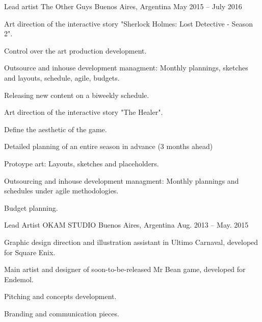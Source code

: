 

\begin{cventries}

  \cventry
      {Lead artist} %
      {The Other Guys} %
      {Buenos Aires, Argentina} %
      {May 2015 – July 2016} %
      {
        \begin{cvitems} %
          \item {Art direction of the interactive story "Sherlock Holmes: Lost Detective - Season 2".}
          \item {Control over the art production development.}
          \item {Outsource and inhouse development managment: Monthly plannings, sketches and layouts, schedule, agile, budgets.}
          \item {Releasing new content on a biweekly schedule.}
          \item {Art direction of the interactive story "The Healer".}
          \item {Define the aesthetic of the game.}
          \item {Detailed planning of an entire season in advance (3 months ahead)}
          \item {Protoype art: Layouts, sketches and placeholders.}
          \item {Outsourcing and inhouse development managment: Monthly plannings and schedules under agile methodologies.}
          \item {Budget planning.}
        \end{cvitems}
      }


  \cventry
    {Lead Artist} %
    {OKAM STUDIO} %
    {Buenos Aires, Argentina} %
    {Aug. 2013 – May. 2015} %
    {
      \begin{cvitems} %
        \item {Graphic design direction and illustration assistant in Ultimo Carnaval, developed for Square Enix.}
        \item {Main artist and designer of soon-to-be-released Mr Bean game, developed for Endemol.}
        \item {Pitching and concepts development.}
        \item {Branding and communication pieces.}
      \end{cvitems}
    }


\end{cventries}

